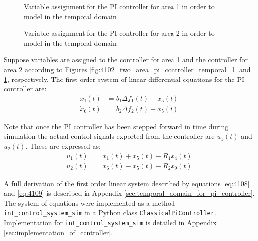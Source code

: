 \begin{figure}[h]
	\begin{minipage}[b]{0.5\textwidth}
		\resizebox{7.0cm}{!}{}
		\caption{Variable assignment for the PI controller for area 1 in order to model in the temporal domain}
		\label{fig:4102_two_area_pi_controller_temporal_1}
	\end{minipage}
	\hspace{0.1cm}
	\begin{minipage}[b]{0.5\textwidth}
		\resizebox{7.2cm}{!}{}
		\caption{Variable assignment for the PI controller for area 2 in order to model in the temporal domain}
		\label{fig:4103_two_area_pi_controller_temporal_2}
	\end{minipage}
\end{figure}

Suppose variables are assigned to the controller for area 1 and the controller for area 2 according to Figures \ref{fig:4102_two_area_pi_controller_temporal_1} and \ref{fig:4103_two_area_pi_controller_temporal_2}, respectively. The first order system of linear differential equations for the PI controller are:
\begin{align}
	\dot{x}_1(t) &= b_1 \Delta f_1(t) + x_5(t) \label{eq:4108} \\
	\dot{x}_6(t) &= b_2 \Delta f_2(t) - x_5(t) \label{eq:4109}
\end{align}

Note that once the PI controller has been stepped forward in time during simulation the actual control signals exported from the controller are $u_1(t)$ and $u_2(t)$. These are expressed as:
\begin{align}
	u_1(t) &= x_1(t) + x_5(t) - R_1 x_4(t) \\
	u_2(t) &= x_6(t) - x_5(t) - R_2 x_9(t) 
\end{align}

A full derivation of the first order linear system described by equations \ref{eq:4108} and \ref{eq:4109} is described in Appendix \ref{sec:temporal_domain_for_pi_controller}. The system of equations were implemented as a method \verb|int_control_system_sim| in a Python class \verb|ClassicalPiController|. Implementation for \verb|int_control_system_sim| is detailed in Appendix \ref{sec:implementation_of_controller}.


